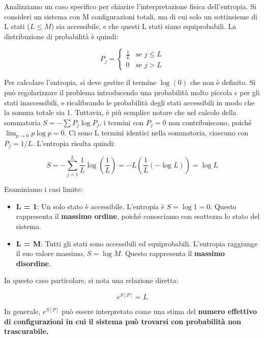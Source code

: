 Analizziamo un caso specifico per chiarire l'interpretazione fisica dell'entropia. Si consideri un sistema con M configurazioni totali, ma di cui solo un sottinsieme di L stati ($L \le M$) sia accessibile, e che questi L stati siano equiprobabili.
La distribuzione di probabilità è quindi:

\begin{equation}
P_j =
\begin{cases}
\frac{1}{L} & \text{se } j \le L \\
0 & \text{se } j > L
\end{cases}
\end{equation}

Per calcolare l'entropia, si deve gestire il termine $\log(0)$ che non è definito. Si può regolarizzare il problema introducendo una probabilità molto piccola $\epsilon$ per gli stati inaccessibili, e ricalibrando le probabilità degli stati accessibili in modo che la somma totale sia 1. Tuttavia, è più semplice notare che nel calcolo della sommatoria $S = - \sum P_j \log P_j$, i termini con $P_j = 0$ non contribuiscono, poiché $\lim_{p \to 0} p \log p = 0$.
Ci sono L termini identici nella sommatoria, ciascuno con $P_j = 1/L$. L'entropia risulta quindi:

\begin{equation}
S = - \sum_{j=1}^{L} \frac{1}{L} \log\left(\frac{1}{L}\right) = -L \left(\frac{1}{L} (-\log L)\right) = \log L
\end{equation}

Esaminiamo i casi limite:
\begin{itemize}
    \item \textbf{L = 1}: Un solo stato è accessibile. L'entropia è $S = \log 1 = 0$. Questo rappresenta il \textbf{massimo ordine}, poiché conosciamo con esattezza lo stato del sistema.
    \item \textbf{L = M}: Tutti gli stati sono accessibili ed equiprobabili. L'entropia raggiunge il suo valore massimo, $S = \log M$. Questo rappresenta il \textbf{massimo disordine}.
\end{itemize}

In questo caso particolare, si nota una relazione diretta:

\begin{equation}
e^{S[P]} = L
\end{equation}

In generale, $e^{S[P]}$ può essere interpretato come una stima del \textbf{numero effettivo di configurazioni in cui il sistema può trovarsi con probabilità non trascurabile.}

